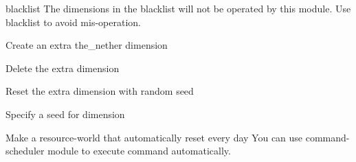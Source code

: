 \begin{Configuration}
    \item[blacklist]{
        The dimensions in the blacklist will not be operated by this module.
        Use blacklist to avoid mis-operation.
    }
\end{Configuration}

\begin{example}{Create an extra the\_nether dimension}
\end{example}

\begin{example}{Delete the extra dimension}
\end{example}

\begin{example}{Reset the extra dimension with random seed}
\end{example}

\begin{tips}{Specify a seed for dimension}
    \\
\end{tips}

\begin{tips}{Make a resource-world that automatically reset every day}
    You can use command-scheduler module to execute  command automatically.
\end{tips}
